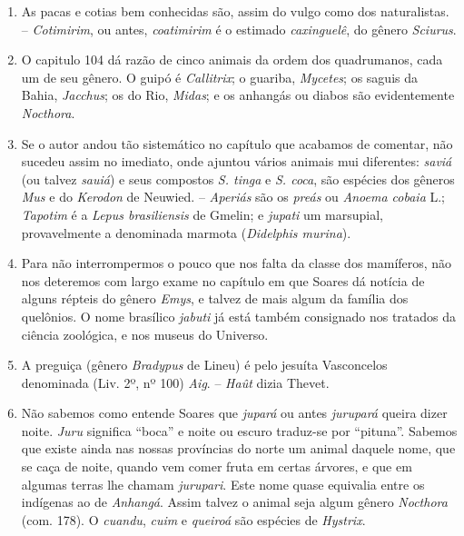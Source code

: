 \begin{enumerate}
\item As pacas e cotias bem conhecidas são, assim do vulgo como dos naturalistas. -- 
\textit{Cotimirim}, ou antes, \textit{coatimirim} é o estimado \textit{caxinguelê}, do gênero \textit{Sciurus}.

\item O capitulo 104 dá razão de cinco animais da ordem dos quadrumanos, cada um 
de seu gênero. O guipó é \textit{Callitrix}; o guariba, \textit{Mycetes}; os saguis da Bahia, \textit{Jacchus}; os 
do Rio, \textit{Midas}; e os anhangás ou diabos são evidentemente \textit{Nocthora}.

\item Se o autor andou tão sistemático no capítulo que acabamos de comentar, não 
sucedeu assim no imediato, onde ajuntou vários animais mui diferentes: \textit{saviá} (ou 
talvez \textit{sauiá}) e seus compostos \textit{S. tinga} e \textit{S. coca}, são espécies dos gêneros \textit{Mus} e do  
\textit{Kerodon} de Neuwied. -- \textit{Aperiás} são os \textit{preás} ou \textit{Anoema cobaia} L.; \textit{Tapotim} é a \textit{Lepus 
brasiliensis} de Gmelin; e \textit{jupati} um marsupial,  provavelmente  a  denominada marmota (\textit{Didelphis murina}).

\item Para não interrompermos o pouco que nos falta da classe dos mamíferos, não nos 
deteremos com largo exame no capítulo em que Soares dá notícia de alguns répteis do 
gênero \textit{Emys}, e talvez de mais algum da família dos quelônios. O nome brasílico \textit{jabuti} 
já está também consignado nos tratados da ciência zoológica, e nos museus do 
Universo.

\item A preguiça (gênero \textit{Bradypus} de Lineu) é pelo jesuíta Vasconcelos denominada 
(Liv. 2º, nº 100) \textit{Aig}. -- \textit{Haût} dizia Thevet.

\item Não sabemos como entende Soares que \textit{jupará} ou antes \textit{jurupará} queira dizer 
noite. \textit{Juru} significa ``boca''  e noite ou escuro traduz-se por ``pituna''.  Sabemos que 
existe ainda nas nossas províncias do norte um animal daquele nome, que se caça de 
noite, quando vem comer fruta em certas árvores, e que em algumas terras lhe chamam 
\textit{jurupari}. Este nome quase equivalia entre os indígenas ao de \textit{Anhangá}. Assim talvez o 
animal seja algum gênero \textit{Nocthora} (com. 178). O \textit{cuandu}, \textit{cuim} e \textit{queiroá} são espécies 
de \textit{Hystrix}.


\end{enumerate}
